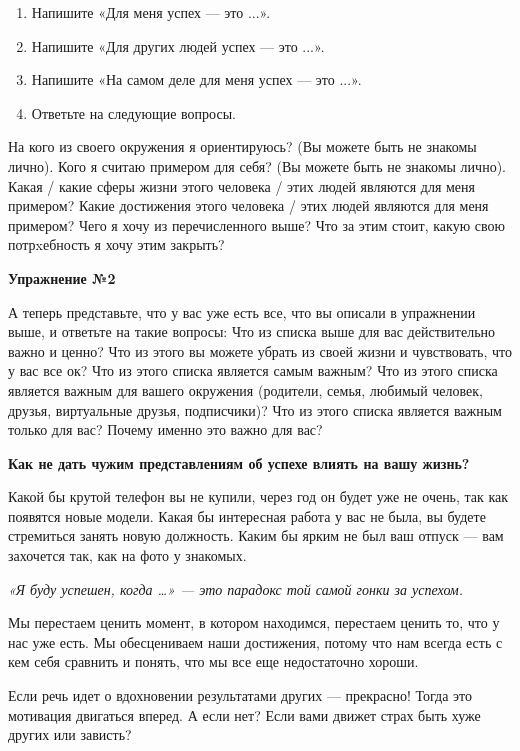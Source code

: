 \begin{enumerate}
    \item Напишите «Для меня успех — это ...».
    \item Напишите «Для других людей успех — это  ...».
    \item Напишите «На самом деле для меня успех — это ...».
    \item Ответьте на следующие вопросы.
\end{enumerate}

На кого из своего окружения я ориентируюсь? (Вы можете быть не знакомы лично). Кого я считаю примером для себя? (Вы можете быть не знакомы лично).
Какая / какие сферы жизни этого человека / этих людей являются для меня примером? Какие достижения этого человека / этих людей являются для меня примером? Чего я хочу из перечисленного выше?
Что за этим стоит, какую свою потрxебность я хочу этим закрыть?

\textbf{Упражнение №2}

А теперь представьте, что у вас уже есть все, что вы описали в упражнении выше, и ответьте на такие вопросы: Что из списка выше для вас действительно важно и ценно? Что из этого вы можете убрать из своей жизни и чувствовать, что у вас все ок? Что из этого списка является самым важным? Что из этого списка является важным для вашего окружения (родители, семья, любимый человек, друзья, виртуальные друзья, подписчики)? Что из этого списка является важным только для вас? Почему именно это важно для вас?

\textbf{Как не дать чужим представлениям об успехе влиять на вашу жизнь?}

Какой бы крутой телефон вы не купили, через год он будет уже не очень, так как появятся новые модели. Какая бы интересная работа у вас не была, вы будете стремиться занять новую должность. Каким бы ярким не был ваш отпуск — вам захочется так, как на фото у знакомых.

{\it
«Я буду успешен, когда …» — это парадокс той самой гонки за успехом.
}

Мы перестаем ценить момент, в котором находимся, перестаем ценить то, что у нас уже есть. Мы обесцениваем наши достижения, потому что нам всегда есть с кем себя сравнить и понять, что мы все еще недостаточно хороши.

\begin{fancyquotes}
    Если речь идет о вдохновении результатами других — прекрасно! Тогда это мотивация двигаться вперед. А если нет? Если вами движет страх быть хуже других или зависть?
\end{fancyquotes}


